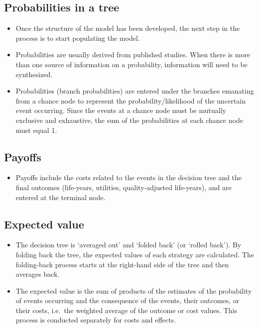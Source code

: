 \documentclass[
]{book}
\providecommand{\tightlist}{%
  \setlength{\itemsep}{0pt}\setlength{\parskip}{0pt}}
\begin{document}
\hypertarget{probabilities-in-a-tree}{%
\subsection{Probabilities in a tree}\label{probabilities-in-a-tree}}

\begin{itemize}
\tightlist
\item
  Once the structure of the model has been developed, the next step in the process is to start populating the model.
\item
  Probabilities are usually derived from published studies. When there is more than one source of information on a probability, information will need to be synthesized.
\item
  Probabilities (branch probabilities) are entered under the branches emanating from a chance node to represent the probability/likelihood of the uncertain event occurring. Since the events at a chance node must be mutually exclusive and exhaustive, the sum of the probabilities at each chance node must equal 1.
\end{itemize}

\hypertarget{payoffs}{%
\subsection{Payoffs}\label{payoffs}}

\begin{itemize}
\tightlist
\item
  Payoffs include the costs related to the events in the decision tree and the final outcomes (life-years, utilities, quality-adjusted life-years), and are entered at the terminal node.
\end{itemize}

\hypertarget{expected-value}{%
\subsection{Expected value}\label{expected-value}}

\begin{itemize}
\tightlist
\item
  The decision tree is `averaged out' and `folded back' (or `rolled back'). By folding back the tree, the expected values of each strategy are calculated. The folding-back process starts at the right-hand side of the tree and then averages back.
\item
  The expected value is the sum of products of the estimates of the probability of events occurring and the consequence of the events, their outcomes, or their costs, i.e.~the weighted average of the outcome or cost values. This process is conducted separately for costs and effects.
\end{itemize}
\end{document}
